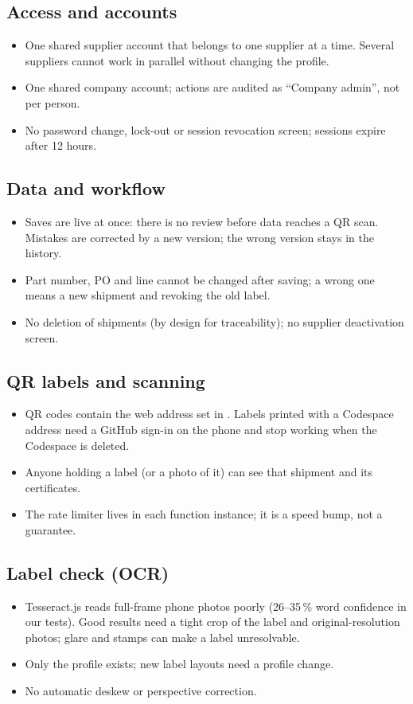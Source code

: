 \documentclass[11pt,a4paper]{article}
\begin{document}
\subsection{Access and accounts}
\begin{itemize}
  \item One shared supplier account that belongs to one supplier at a time. Several suppliers cannot work in parallel
    without changing the profile.
  \item One shared company account; actions are audited as ``Company admin'', not per person.
  \item No password change, lock-out or session revocation screen; sessions expire after 12 hours.
\end{itemize}

\subsection{Data and workflow}
\begin{itemize}
  \item Saves are live at once: there is no review before data reaches a QR scan. Mistakes are corrected by a new
    version; the wrong version stays in the history.
  \item Part number, PO and line cannot be changed after saving; a wrong one means a new shipment and revoking the
    old label.
  \item No deletion of shipments (by design for traceability); no supplier deactivation screen.
\end{itemize}

\subsection{QR labels and scanning}
\begin{itemize}
  \item QR codes contain the web address set in . Labels printed with a Codespace address need a
    GitHub sign-in on the phone and stop working when the Codespace is deleted.
  \item Anyone holding a label (or a photo of it) can see that shipment and its certificates.
  \item The rate limiter lives in each function instance; it is a speed bump, not a guarantee.
\end{itemize}

\subsection{Label check (OCR)}
\begin{itemize}
  \item Tesseract.js reads full-frame phone photos poorly (26--35\,\% word confidence in our tests). Good results need a
    tight crop of the label and original-resolution photos; glare and stamps can make a label unresolvable.
  \item Only the  profile exists; new label layouts need a profile change.
  \item No automatic deskew or perspective correction.
\end{itemize}
\end{document}
